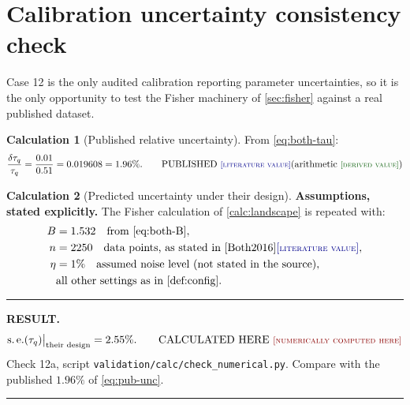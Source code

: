 \documentclass[11pt,a4paper]{article}
\theoremstyle{definition}
\newtheorem{calculationx}{Calculation}[section]
\newenvironment{resultbox}%
  {\par\medskip\noindent\begin{minipage}{\linewidth}%
   \rule{\linewidth}{1.0pt}\par\noindent\textbf{RESULT.}\enspace}%
  {\par\rule{\linewidth}{1.0pt}\end{minipage}\par\medskip}
\newcommand{\LIT}{\textcolor{blue!55!black}{\footnotesize[\textsc{literature value}]}}
\newcommand{\DER}{\textcolor{green!35!black}{\footnotesize[\textsc{derived value}]}}
\newcommand{\NUM}{\textcolor{red!55!black}{\footnotesize[\textsc{numerically computed here}]}}
\newcommand{\tq}{\tau_{q}}
\newcommand{\Bnum}{B}
\begin{document}
\section{Calibration uncertainty consistency check}
\label{sec:uncertainty-check}

Case 12 is the only audited calibration reporting parameter uncertainties, so
it is the only opportunity to test the Fisher machinery of \cref{sec:fisher}
against a real published dataset.

\begin{calculationx}[Published relative uncertainty]
\label{calc:pub-unc}
From \eqref{eq:both-tau}:
\begin{equation}
  \frac{\delta\tq}{\tq}
   = \frac{0.01}{0.51}
   = 0.019608
   = 1.96\% .
  \qquad\text{PUBLISHED \LIT (arithmetic \DER)}
  \label{eq:pub-unc}
\end{equation}
\end{calculationx}

\begin{calculationx}[Predicted uncertainty under their design]
\label{calc:pred-unc}
\textbf{Assumptions, stated explicitly.} The Fisher calculation of
\cref{calc:landscape} is repeated with:
\begin{align}
  \Bnum &= 1.532 \quad\text{from \eqref{eq:both-B}} ,
  \label{eq:pred-1}\\
  n &= 2250 \quad\text{data points, as stated in \cite{Both2016}} \LIT ,
  \label{eq:pred-2}\\
  \eta &= 1\% \quad\text{assumed noise level (not stated in the source)} ,
  \label{eq:pred-3}\\
  &\text{all other settings as in \cref{def:config}} .
  \label{eq:pred-4}
\end{align}
\end{calculationx}

\begin{resultbox}
\begin{equation}
  \operatorname{s.e.}(\tq)\big|_{\text{their design}} = 2.55\% .
  \qquad\text{CALCULATED HERE \NUM}
  \label{eq:pred-unc}
\end{equation}
Check 12a, script \texttt{validation/calc/check\_numerical.py}. Compare
with the published $1.96\%$ of \eqref{eq:pub-unc}.
\end{resultbox}
\end{document}
